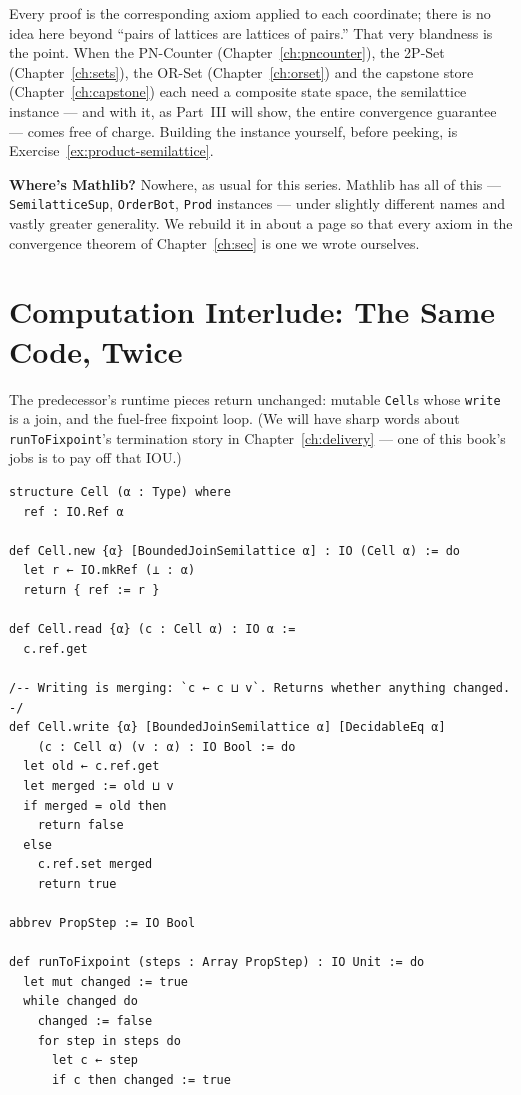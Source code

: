 \documentclass[12pt, a4paper, openright]{book}
\theoremstyle{thmstyle}
\theoremstyle{defstyle}
\newcommand{\lc}[1]{\texttt{#1}}
\newenvironment{notebox}{%
  \begin{tcolorbox}[notebox]%
}{\end{tcolorbox}}
\begin{document}
Every proof is the corresponding axiom applied to each coordinate; there
is no idea here beyond ``pairs of lattices are lattices of pairs.'' That
very blandness is the point. When the PN-Counter
(Chapter~\ref{ch:pncounter}), the 2P-Set (Chapter~\ref{ch:sets}), the
OR-Set (Chapter~\ref{ch:orset}) and the capstone store
(Chapter~\ref{ch:capstone}) each need a composite state space, the
semilattice instance --- and with it, as Part~III will show, the entire
convergence guarantee --- comes free of charge. Building the instance
yourself, before peeking, is Exercise~\ref{ex:product-semilattice}.

\begin{notebox}
  \textbf{Where's Mathlib?} Nowhere, as usual for this series. Mathlib
  has all of this --- \lc{SemilatticeSup}, \lc{OrderBot}, \lc{Prod}
  instances --- under slightly different names and vastly greater
  generality. We rebuild it in about a page so that every axiom in the
  convergence theorem of Chapter~\ref{ch:sec} is one we wrote ourselves.
\end{notebox}

\section{Computation Interlude: The Same Code, Twice}

The predecessor's runtime pieces return unchanged: mutable \lc{Cell}s
whose \lc{write} is a join, and the fuel-free fixpoint loop. (We will
have sharp words about \lc{runToFixpoint}'s termination story in
Chapter~\ref{ch:delivery} --- one of this book's jobs is to pay off that
IOU.)

\begin{verbatim}
structure Cell (α : Type) where
  ref : IO.Ref α

def Cell.new {α} [BoundedJoinSemilattice α] : IO (Cell α) := do
  let r ← IO.mkRef (⊥ : α)
  return { ref := r }

def Cell.read {α} (c : Cell α) : IO α :=
  c.ref.get

/-- Writing is merging: `c ← c ⊔ v`. Returns whether anything changed. -/
def Cell.write {α} [BoundedJoinSemilattice α] [DecidableEq α]
    (c : Cell α) (v : α) : IO Bool := do
  let old ← c.ref.get
  let merged := old ⊔ v
  if merged = old then
    return false
  else
    c.ref.set merged
    return true

abbrev PropStep := IO Bool

def runToFixpoint (steps : Array PropStep) : IO Unit := do
  let mut changed := true
  while changed do
    changed := false
    for step in steps do
      let c ← step
      if c then changed := true
\end{verbatim}
\end{document}

